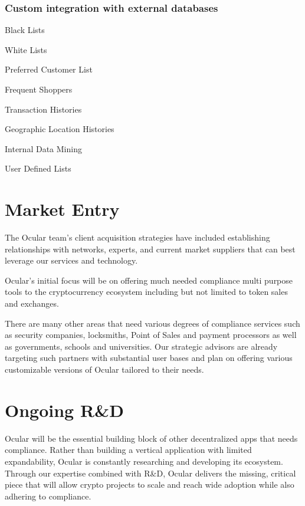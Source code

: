 \documentclass[12pt]{article}
\let\tempone\itemize
\let\temptwo\enditemize
\renewenvironment{itemize}{\tempone\addtolength{\itemsep}{-5pt}}{\temptwo}
\begin{document}
\subsubsection*{Custom integration with external databases}
\begin{itemize}
\item Black Lists
\item White Lists
\item Preferred Customer List
\item Frequent Shoppers
\item Transaction Histories
\item Geographic Location Histories
\item Internal Data Mining
\item User Defined Lists 
\end{itemize}

\clearpage

\section{Market Entry}
The Ocular team’s client acquisition strategies have included establishing relationships with networks, experts, and current market suppliers that can best leverage our services and technology. 

Ocular’s initial focus will be on offering much needed compliance multi purpose tools to the cryptocurrency ecosystem including but not limited to token sales and exchanges.

There are many other areas that need various degrees of compliance services such as security companies, locksmiths, Point of Sales and payment processors as well as governments, schools and universities. Our strategic advisors are already targeting such partners with substantial user bases and plan on offering various customizable versions of Ocular tailored to their needs.  
\section{Ongoing R\&D}
Ocular will be the essential building block of other decentralized apps that needs compliance. Rather than building a vertical application with limited expandability, Ocular is constantly researching and developing its ecosystem. Through our expertise combined  with R\&D, Ocular delivers the missing, critical piece that will allow crypto projects to scale and reach wide adoption while also adhering to compliance.
\clearpage
\end{document}
